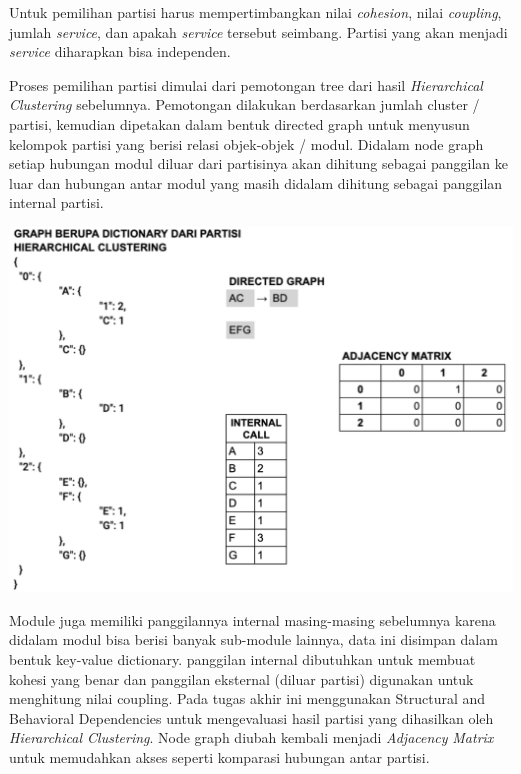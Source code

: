 Untuk pemilihan partisi harus mempertimbangkan nilai \textit{cohesion}, nilai \textit{coupling}, jumlah \textit{service}, dan apakah \textit{service} tersebut seimbang. Partisi yang akan menjadi \textit{service} diharapkan bisa independen. 

Proses pemilihan partisi dimulai dari pemotongan tree dari hasil \textit{Hierarchical Clustering} sebelumnya. Pemotongan dilakukan berdasarkan jumlah cluster / partisi, kemudian  dipetakan dalam bentuk directed graph untuk menyusun kelompok partisi yang berisi relasi objek-objek / modul. Didalam node graph setiap hubungan modul diluar dari partisinya akan dihitung sebagai panggilan ke luar dan hubungan antar modul yang masih didalam  dihitung sebagai panggilan internal partisi.

\begin{center}
	\includegraphics[width=14cm]{img/bab_3/eval_detail1.png}
	\label{fig:asd}
\end{center}

Module juga memiliki panggilannya internal masing-masing sebelumnya karena didalam modul bisa berisi banyak sub-module lainnya, data ini disimpan dalam bentuk key-value dictionary. panggilan internal dibutuhkan untuk membuat kohesi yang benar dan panggilan eksternal (diluar partisi) digunakan untuk menghitung nilai coupling.  Pada tugas akhir ini menggunakan Structural and Behavioral Dependencies untuk mengevaluasi hasil partisi yang dihasilkan oleh \textit{Hierarchical Clustering}. Node graph diubah kembali menjadi \textit{Adjacency} \textit{Matrix} untuk memudahkan akses seperti komparasi hubungan antar partisi. 

